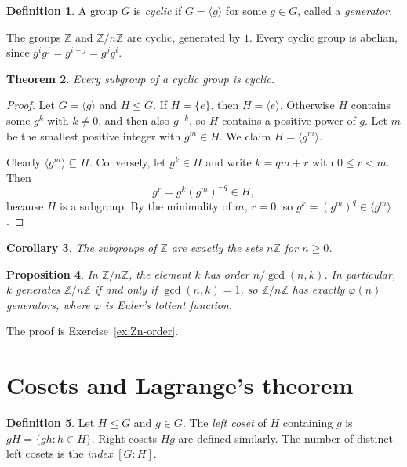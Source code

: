 \documentclass[11pt]{article}
\theoremstyle{plain}
\newtheorem{theorem}{Theorem}[section]
\newtheorem{proposition}[theorem]{Proposition}
\newtheorem{corollary}[theorem]{Corollary}
\theoremstyle{definition}
\newtheorem{definition}[theorem]{Definition}
\theoremstyle{remark}
\newcommand{\Z}{\mathbb{Z}}
\newcommand{\gen}[1]{\langle #1 \rangle}
\begin{document}
\begin{definition}
A group $G$ is \emph{cyclic} if $G = \gen{g}$ for some $g \in G$, called a \emph{generator}.
\end{definition}

The groups $\Z$ and $\Z/n\Z$ are cyclic, generated by $1$. Every cyclic group is abelian, since $g^i g^j = g^{i+j} = g^j g^i$.

\begin{theorem}\label{thm:cyclic-subgroups}
Every subgroup of a cyclic group is cyclic.
\end{theorem}

\begin{proof}
Let $G = \gen{g}$ and $H \le G$. If $H = \{e\}$, then $H = \gen{e}$. Otherwise $H$ contains some $g^k$ with $k \neq 0$, and then also $g^{-k}$, so $H$ contains a positive power of $g$. Let $m$ be the smallest positive integer with $g^m \in H$. We claim $H = \gen{g^m}$.

Clearly $\gen{g^m} \subseteq H$. Conversely, let $g^k \in H$ and write $k = qm + r$ with $0 \le r < m$. Then
\[
  g^r = g^k (g^m)^{-q} \in H,
\]
because $H$ is a subgroup. By the minimality of $m$, $r = 0$, so $g^k = (g^m)^q \in \gen{g^m}$.
\end{proof}

\begin{corollary}\label{cor:subgroups-of-Z}
The subgroups of $\Z$ are exactly the sets $n\Z$ for $n \ge 0$.
\end{corollary}

\begin{proposition}\label{prop:Zn-generators}
In $\Z/n\Z$, the element $k$ has order $n / \gcd(n, k)$. In particular, $k$ generates $\Z/n\Z$ if and only if $\gcd(n, k) = 1$, so $\Z/n\Z$ has exactly $\varphi(n)$ generators, where $\varphi$ is Euler's totient function.
\end{proposition}

The proof is Exercise~\ref{ex:Zn-order}.

\section{Cosets and Lagrange's theorem}

\begin{definition}
Let $H \le G$ and $g \in G$. The \emph{left coset} of $H$ containing $g$ is $gH = \{gh : h \in H\}$. Right cosets $Hg$ are defined similarly. The number of distinct left cosets is the \emph{index} $[G : H]$.
\end{definition}
\end{document}
